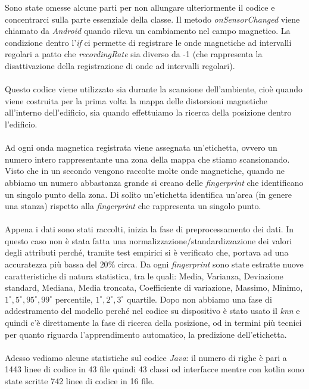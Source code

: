 Sono state omesse alcune parti per non allungare ulteriormente il codice e concentrarci sulla parte essenziale della classe. Il metodo \textit{onSensorChanged} viene chiamato da \textit{Android} quando rileva un cambiamento nel campo magnetico. La condizione dentro l'\textit{if} ci permette di registrare le onde magnetiche ad intervalli regolari a patto che \textit{recordingRate} sia diverso da -1 (che rappresenta la  disattivazione della registrazione di onde ad intervalli regolari).
\\\\
Questo codice viene utilizzato sia durante la scansione dell'ambiente, cio\`e quando viene costruita per la prima volta la mappa delle distorsioni magnetiche all'interno dell'edificio, sia quando effettuiamo la ricerca della posizione dentro l'edificio.
\\\\
Ad ogni onda magnetica registrata viene assegnata un'etichetta, ovvero un numero intero rappresentante una zona della mappa che stiamo scansionando. Visto che in un secondo vengono raccolte molte onde magnetiche, quando ne abbiamo un numero abbastanza grande si creano delle \textit{fingerprint} che identificano un singolo punto della zona. Di solito un'etichetta identifica un'area (in genere una stanza) rispetto alla \textit{fingerprint} che rappresenta un singolo punto.
\\\\
Appena i dati sono stati raccolti, inizia la fase di preprocessamento dei dati. In questo caso non \`e stata fatta una normalizzazione/standardizzazione dei valori degli attributi perch\'e, tramite test empirici si \`e verificato che, portava ad una accuratezza pi\`u  bassa del $20\%$ circa. Da ogni \textit{fingerprint} sono state estratte nuove caratteristiche di natura statistica, tra le quali: Media, Varianza, Deviazione standard, Mediana, Media troncata, Coefficiente di variazione, Massimo, Minimo, $ 1^{\circ}, 5^{\circ}, 95^{\circ}, 99^{\circ} $ percentile, $ 1^{\circ}, 2^{\circ}, 3^{\circ} $ quartile.
Dopo non abbiamo una fase di addestramento del modello perch\'e nel codice su dispositivo  \`e stato usato il \textit{knn} e quindi c'\`e direttamente la fase di ricerca della posizione, od in termini pi\`u  tecnici per quanto riguarda l'apprendimento automatico, la predizione dell'etichetta.
\\\\
Adesso vediamo alcune statistiche sul codice \textit{Java}: il numero di righe \`e pari a 1443 linee di codice in 43 file quindi 43 classi od interfacce mentre con kotlin sono state scritte 742 linee di codice in 16 file.


